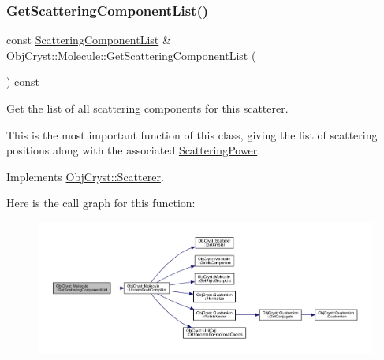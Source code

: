 \subsubsection{\texorpdfstring{GetScatteringComponentList()}{GetScatteringComponentList()}}
{\footnotesize\ttfamily const \mbox{\hyperlink{class_obj_cryst_1_1_scattering_component_list}{Scattering\+Component\+List}} \& Obj\+Cryst\+::\+Molecule\+::\+Get\+Scattering\+Component\+List (\begin{DoxyParamCaption}{ }\end{DoxyParamCaption}) const\hspace{0.3cm}{\ttfamily [virtual]}}



Get the list of all scattering components for this scatterer. 

This is the most important function of this class, giving the list of scattering positions along with the associated \mbox{\hyperlink{class_obj_cryst_1_1_scattering_power}{Scattering\+Power}}. 

Implements \mbox{\hyperlink{class_obj_cryst_1_1_scatterer_aca0e08e3793cc69d31fce53e481c2a67}{Obj\+Cryst\+::\+Scatterer}}.

Here is the call graph for this function\+:
\nopagebreak
\begin{figure}[H]
\begin{center}
\leavevmode
\includegraphics[width=350pt]{class_obj_cryst_1_1_molecule_a03f7f32ade8523f118cab14a21a87843_cgraph}
\end{center}
\end{figure}
\mbox{\label{class_obj_cryst_1_1_molecule_a9a43c803d62dc4f5f3b7852bbd75c939}} 
